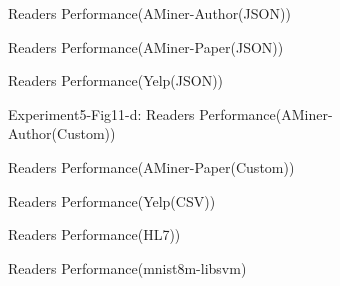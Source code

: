 \documentclass[sigconf,nonacm,screen]{acmart}
\begin{document}
   
    
    \begin{figure}[h]
        \centering
        
        \caption{Readers Performance(AMiner-Author(JSON))}
    \end{figure}

    \begin{figure}[h]
        \centering
        
        \caption{Readers Performance(AMiner-Paper(JSON))}
    \end{figure}

    \begin{figure}[h]
        \centering
        
        \caption{Readers Performance(Yelp(JSON))}
    \end{figure}

    \begin{figure}[h]
        \centering
        
        \caption{Experiment5-Fig11-d: Readers Performance(AMiner-Author(Custom))}
    \end{figure}

    \begin{figure}[h]
        \centering
        
        \caption{Readers Performance(AMiner-Paper(Custom))}
    \end{figure}

    \begin{figure}[h]
        \centering
        
        \caption{ Readers Performance(Yelp(CSV))}
    \end{figure}

    \begin{figure}[h]
        \centering
        
        \caption{Readers Performance(HL7))}
    \end{figure}

    \begin{figure}[h]
        \centering
        
        \caption{Readers Performance(mnist8m-libsvm)}
    \end{figure}
\end{document}
